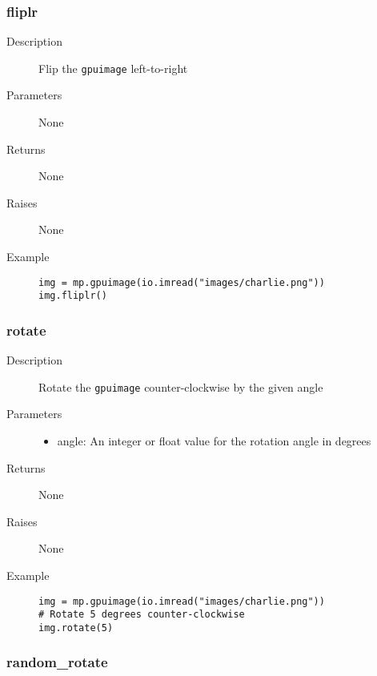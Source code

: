 \subsubsection{fliplr}

\begin{description}
   \item[Description] Flip the \verb|gpuimage| left-to-right
   \item[Parameters] None
   \item[Returns] None
   \item[Raises] None
   \item[Example] \phantom{}
   \begin{lstlisting}
img = mp.gpuimage(io.imread("images/charlie.png"))
img.fliplr()
\end{lstlisting}
\end{description}

\subsubsection{rotate}

\begin{description}
   \item[Description] Rotate the \verb|gpuimage| counter-clockwise by the given angle
   \item[Parameters] \phantom{}
   \begin{itemize}
   \item angle: An integer or float value for the rotation angle in degrees
   \end{itemize}
   \item[Returns] None
   \item[Raises] None
   \item[Example] \phantom{}
   \begin{lstlisting}
img = mp.gpuimage(io.imread("images/charlie.png"))
# Rotate 5 degrees counter-clockwise
img.rotate(5)
\end{lstlisting}
\end{description}

\subsubsection{random\_rotate}

